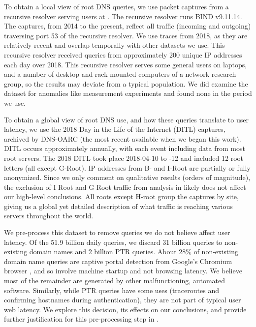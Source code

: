 \documentclass[sigconf,letterpaper,nonacm,10pt,anonymous]{acmart}
\begin{document}
To obtain a local view of root DNS queries, we use packet captures from
a recursive resolver serving users at \ISIone. The recursive resolver
runs BIND v9.11.14. The captures, from 2014 to the present, reflect all
traffic (incoming and outgoing) traversing port 53 of the recursive
resolver. We use traces from 2018, as they are relatively recent and
overlap temporally with other datasets we use. This recursive resolver
received queries from approximately 200 unique IP addresses each day
over 2018. This recursive resolver serves some general users on laptops,
and a number of desktop and rack-mounted computers of a network research
group, so the results may deviate from a typical population. We did
examine the dataset for anomalies like measurement experiments and found
none in the period we use.

To obtain a global view of root DNS use, and how these queries translate
to user latency, we use the 2018 Day in the Life of the Internet (DITL)
captures, archived by DNS-OARC \cite{ditl} (the most recent available
when we began this work). DITL occurs approximately annually, with each
event including data from most root servers. The 2018 DITL took place
2018-04-10 to -12 and included 12 root letters (all except G-Root). IP
addresses from B- and I-Root are partially or fully anonymized. Since we
only comment on qualitative results (orders of magnitude), the exclusion
of I Root and G Root traffic from analysis in
 likely does not affect our high-level
conclusions. All roots except H-root group the captures by site, giving
us a global yet detailed description of what traffic is reaching various
servers throughout the world.

We pre-process this dataset to remove queries we do not believe affect
user latency. Of the 51.9 billion daily queries, we discard 31 billion
queries to non-existing domain names and 2 billion PTR queries. About
28\% of non-existing domain name queries are captive portal detection
from Google's Chromium browser \cite{broot_invalid_queries}, and so
involve machine startup and not browsing latency. We believe most of the
remainder are generated by other malfunctioning, automated software.
Similarly, while PTR queries have some uses (traceroutes and confirming
hostnames during authentication), they are not part of typical user web
latency. We explore this decision, its effects on our conclusions, and
provide further justification for this pre-processing step in
.
\end{document}
